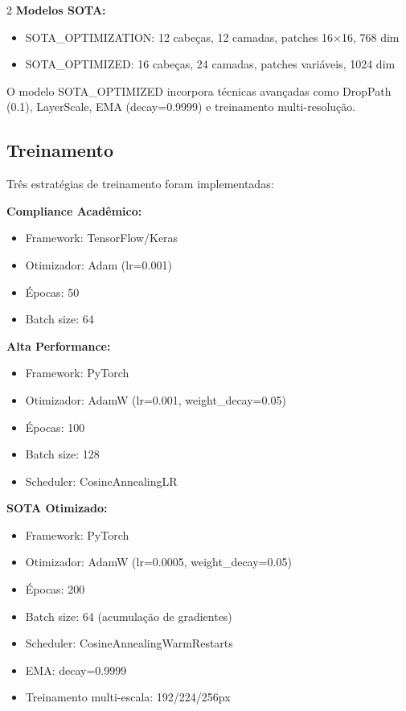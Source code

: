 \documentclass[conference]{IEEEtran}
\begin{document}
\begin{multicols}{2}
\textbf{Modelos SOTA:}
\begin{itemize}
    \item SOTA\_OPTIMIZATION: 12 cabeças, 12 camadas, patches 16×16, 768 dim
    \item SOTA\_OPTIMIZED: 16 cabeças, 24 camadas, patches variáveis, 1024 dim
\end{itemize}

O modelo SOTA\_OPTIMIZED incorpora técnicas avançadas como DropPath (0.1), LayerScale, EMA (decay=0.9999) e treinamento multi-resolução.

\subsection{Treinamento}
Três estratégias de treinamento foram implementadas:

\textbf{Compliance Acadêmico:}
\begin{itemize}
    \item Framework: TensorFlow/Keras
    \item Otimizador: Adam (lr=0.001)
    \item Épocas: 50
    \item Batch size: 64
\end{itemize}

\textbf{Alta Performance:}
\begin{itemize}
    \item Framework: PyTorch
    \item Otimizador: AdamW (lr=0.001, weight\_decay=0.05)
    \item Épocas: 100
    \item Batch size: 128
    \item Scheduler: CosineAnnealingLR
\end{itemize}

\textbf{SOTA Otimizado:}
\begin{itemize}
    \item Framework: PyTorch
    \item Otimizador: AdamW (lr=0.0005, weight\_decay=0.05)
    \item Épocas: 200
    \item Batch size: 64 (acumulação de gradientes)
    \item Scheduler: CosineAnnealingWarmRestarts
    \item EMA: decay=0.9999
    \item Treinamento multi-escala: 192/224/256px
\end{itemize}


\end{multicols}
\end{document}
